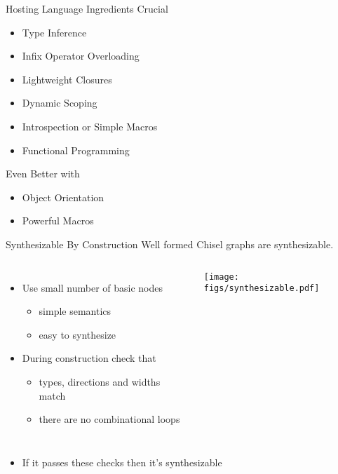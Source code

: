 \begin{frame}[fragile]{Hosting Language Ingredients}
Crucial
\begin{itemize}
\item Type Inference
\item Infix Operator Overloading
\item Lightweight Closures
\item Dynamic Scoping
\item Introspection or Simple Macros
\item Functional Programming
\end{itemize}
\vspace{0.5cm}
Even Better with
\begin{itemize}
\item Object Orientation
\item Powerful Macros
\end{itemize}
\end{frame}

\begin{frame}[fragile]{Synthesizable By Construction}
Well formed Chisel graphs are synthesizable.
\begin{columns}
\begin{itemize}
\item Use small number of basic nodes
\begin{itemize}
\item simple semantics
\item easy to synthesize
\end{itemize}
\item During construction check that
\begin{itemize}
\item types, directions and widths match
\item there are no combinational loops
\end{itemize}
\end{itemize}
\begin{center}
\texttt{[image: figs/synthesizable.pdf]}
\end{center}
\end{columns}
\vspace{1cm}
\begin{itemize}
\item {\color{red}If it passes these checks then it's synthesizable}
\end{itemize}
\end{frame}

